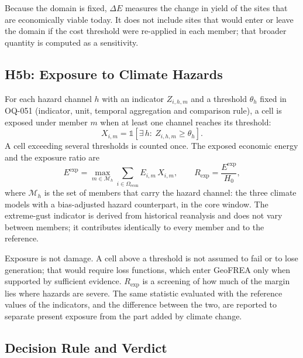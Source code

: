 Because the domain is fixed, $\Delta E$ measures the change in yield of the sites
that are economically viable today. It does not include sites that would enter or
leave the domain if the cost threshold were re-applied in each member; that
broader quantity is computed as a sensitivity.

\subsection{H5b: Exposure to Climate Hazards}
\label{subsec:h5b}

For each hazard channel $h$ with an indicator $Z_{i,h,m}$ and a threshold
$\theta_h$ fixed in OQ-051 (indicator, unit, temporal aggregation and comparison
rule), a cell is exposed under member $m$ when at least one channel reaches its
threshold:
\begin{equation}
    X_{i,m}=\mathbb{1}\!\left[\exists\,h:\ Z_{i,h,m}\geq\theta_h\right].
    \label{eq:h5_exposed_indicator}
\end{equation}
A cell exceeding several thresholds is counted once. The exposed economic energy
and the exposure ratio are
\begin{equation}
    E^{\mathrm{exp}}=\max_{m\in\mathcal{M}_{h}}
    \sum_{i\in\Omega_{\mathrm{econ}}}E_{i,m}\,X_{i,m},
    \qquad
    R_{\mathrm{exp}}=\frac{E^{\mathrm{exp}}}{H_0},
    \label{eq:h5b_statistic}
\end{equation}
where $\mathcal{M}_h$ is the set of members that carry the hazard channel: the
three climate models with a bias-adjusted hazard counterpart, in the core window.
The extreme-gust indicator is derived from historical reanalysis and does not
vary between members; it contributes identically to every member and to the
reference.

Exposure is not damage. A cell above a threshold is not assumed to fail or to
lose generation; that would require loss functions, which enter GeoFREA only when
supported by sufficient evidence. $R_{\mathrm{exp}}$ is a screening of how much of
the margin lies where hazards are severe. The same statistic evaluated with the
reference values of the indicators, and the difference between the two, are
reported to separate present exposure from the part added by climate change.

\subsection{Decision Rule and Verdict}
\label{subsec:h5_rule}

